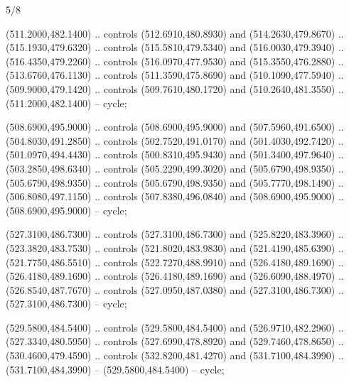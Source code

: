 \begin{flagdescription}{5/8}
\begin{scope}[shift={(m)}]
\begin{scope}[scale=\flagwidth/220,y=0.1mm, x=0.1mm, yscale=-1,shift={(-596,-360)}]
\begin{scope}[draw=black,line join=round,line cap=round,line width=0.381\lw]
\begin{scope}[fill=white]
 (511.2000,482.1400) .. controls (512.6910,480.8930) and
  (514.2630,479.8670) .. (515.1930,479.6320) .. controls (515.5810,479.5340) and
  (516.0030,479.3940) .. (516.4350,479.2260) .. controls (516.0970,477.9530) and
  (515.3550,476.2880) .. (513.6760,476.1130) .. controls (511.3590,475.8690) and
  (510.1090,477.5940) .. (509.9000,479.1420) .. controls (509.7610,480.1720) and
  (510.2640,481.3550) .. (511.2000,482.1400) -- cycle;

 (508.6900,495.9000) .. controls (508.6900,495.9000) and
  (507.5960,491.6500) .. (504.8030,491.2850) .. controls (502.7520,491.0170) and
  (501.4030,492.7420) .. (501.0970,494.4430) .. controls (500.8310,495.9430) and
  (501.3400,497.9640) .. (503.2850,498.6340) .. controls (505.2290,499.3020) and
  (505.6790,498.9350) .. (505.6790,498.9350) .. controls (505.6790,498.9350) and
  (505.7770,498.1490) .. (506.8080,497.1150) .. controls (507.8380,496.0840) and
  (508.6900,495.9000) .. (508.6900,495.9000) -- cycle;

 (527.3100,486.7300) .. controls (527.3100,486.7300) and
  (525.8220,483.3960) .. (523.3820,483.7530) .. controls (521.8020,483.9830) and
  (521.4190,485.6390) .. (521.7750,486.5510) .. controls (522.7270,488.9910) and
  (526.4180,489.1690) .. (526.4180,489.1690) .. controls (526.4180,489.1690) and
  (526.6090,488.4970) .. (526.8540,487.7670) .. controls (527.0950,487.0380) and
  (527.3100,486.7300) .. (527.3100,486.7300) -- cycle;

 (529.5800,484.5400) .. controls (529.5800,484.5400) and
  (526.9710,482.2960) .. (527.3340,480.5950) .. controls (527.6990,478.8920) and
  (529.7460,478.8650) .. (530.4600,479.4590) .. controls (532.8200,481.4270) and
  (531.7100,484.3990) .. (531.7100,484.3990) -- (529.5800,484.5400) -- cycle;


\end{scope}
\end{scope}
\end{scope}
\end{scope}
\end{flagdescription}
